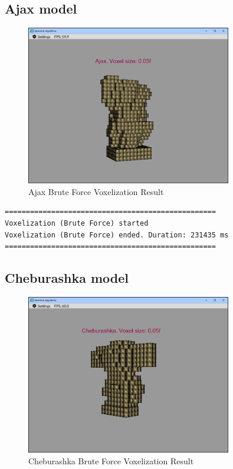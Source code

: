 \documentclass[12pt,a4paper,english]{article}
\begin{document}
\subsection{Ajax model}

\begin{figure}[H]
    \centering
    \includegraphics[width=0.8\textwidth]{p3-1-ajax-brute-force}
    \caption[]{Ajax Brute Force Voxelization Result}
    \label{fig:p3-1-ajax-brute-force}
\end{figure}

\begin{verbatim}
==================================================
Voxelization (Brute Force) started
Voxelization (Brute Force) ended. Duration: 231435 ms
==================================================
\end{verbatim}

\subsection{Cheburashka model}

\begin{figure}[H]
    \centering
    \includegraphics[width=0.8\textwidth]{p3-1-cheburashka-brute-force}
    \caption[]{Cheburashka Brute Force Voxelization Result}
    \label{fig:p3-1-cheburashka-brute-force}
\end{figure}
\end{document}

